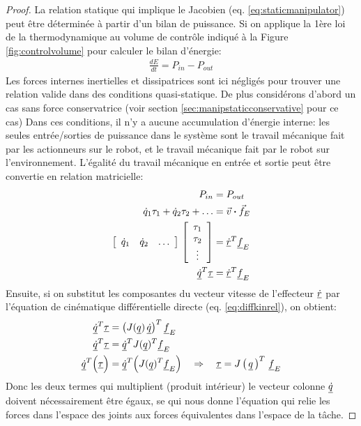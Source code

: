 \begin{proof}
La relation statique qui implique le Jacobien (eq. \eqref{eq:staticmanipulator}) peut être déterminée à partir d'un bilan de puissance. Si on applique la 1ère loi de la thermodynamique au volume de contrôle indiqué à la Figure \ref{fig:controlvolume} pour calculer le bilan d'énergie:
\begin{align}
\frac{dE}{dt} = P_{in} - P_{out}
\end{align}
Les forces internes inertielles et dissipatrices sont ici négligés pour trouver une relation valide dans des conditions quasi-statique. De plus considérons d'abord un cas sans force conservatrice (voir section \ref{sec:manipstaticconservative} pour ce cas) Dans ces conditions, il n'y a aucune accumulation d'énergie interne: les seules entrée/sorties de puissance dans le système sont le travail mécanique fait par les actionneurs sur le robot, et le travail mécanique fait par le robot sur l'environnement. L'égalité du travail mécanique en entrée et sortie peut être convertie en relation matricielle:
\begin{align}
P_{in} &= P_{out} \\
\dot{q}_1 \tau_1  + \dot{q}_2 \tau_2 + \hdots  &= \Vec{v} \boldsymbol{\cdot} \Vec{f}_E \\
\left[ \begin{array}{c c c} 
\dot{q}_1 & \dot{q}_2 & \hdots 
\end{array} \right] \,
\left[ \begin{array}{c} 
\tau_1 \\ \tau_2 \\ \vdots 
\end{array} \right] &= \underline{\dot{r}}^T \underline{f}_E \\
\underline{\dot{q}}^T \underline{\tau} &= \underline{\dot{r}}^T \underline{f}_E \\
\end{align}
Ensuite, si on substitut les composantes du vecteur vitesse de l'effecteur $\underline{\dot{r}}$ par l'équation de cinématique différentielle directe (eq. \eqref{eq:diffkinrel}), on obtient:
\begin{align}
\underline{\dot{q}}^T \underline{\tau} &= \left( J( \underline{q}) \,  \underline{\dot{q}}  \right)^T \underline{f}_E \\
\underline{\dot{q}}^T \underline{\tau} &= \underline{\dot{q}}^T  J( \underline{q})^T \underline{f}_E    \\
\underline{\dot{q}}^T \Big( \underline{\tau} \Big) &= \underline{\dot{q}}^T  \Big( J( \underline{q})^T \underline{f}_E \Big)   
\quad \Rightarrow \quad \underline{\tau} = J\left( \, \underline{q} \, \right)^T \, \underline{f}_E 
\end{align}
Donc les deux termes qui multiplient (produit intérieur) le vecteur colonne $\underline{\dot{q}}$ doivent nécessairement être égaux, se qui nous donne l'équation qui relie les forces dans l'espace des joints aux forces équivalentes dans l'espace de la tâche. 
\end{proof}


